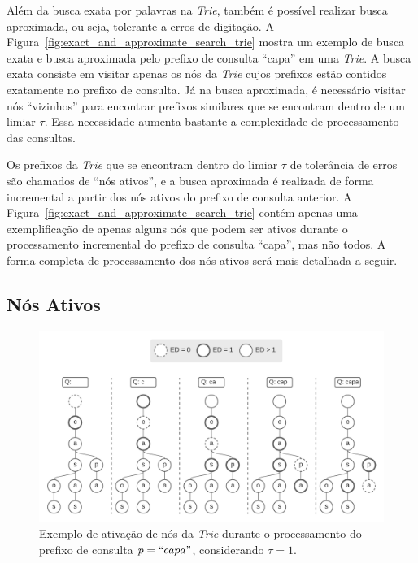 Além da busca exata por palavras na \textit{Trie}, também é possível realizar busca aproximada, ou seja, tolerante a erros de digitação. A Figura~\ref{fig:exact_and_approximate_search_trie} mostra um exemplo de busca exata e busca aproximada pelo prefixo de consulta ``capa'' em uma \textit{Trie}. A busca exata consiste em visitar apenas os nós da \textit{Trie} cujos prefixos estão contidos exatamente no prefixo de consulta. Já na busca aproximada, é necessário visitar nós ``vizinhos'' para encontrar prefixos similares que se encontram dentro de um limiar $\tau$. Essa necessidade aumenta bastante a complexidade de processamento das consultas. 

Os prefixos da \textit{Trie} que se encontram dentro do limiar $\tau$ de tolerância de erros são chamados de ``nós ativos'', e a busca aproximada é realizada de forma incremental a partir dos nós ativos do prefixo de consulta anterior. A Figura~\ref{fig:exact_and_approximate_search_trie} contém apenas uma exemplificação de apenas alguns nós que podem ser ativos durante o processamento incremental do prefixo de consulta ``capa'', mas não todos. A forma completa de processamento dos nós ativos será mais detalhada a seguir.

\subsection{Nós Ativos}
\label{sec:active_nodes}

\begin{figure}[ht]
    \centering
    \includegraphics[width=1\textwidth]{figures/trie_active_nodes_example.png}
    \caption{Exemplo de ativação de nós da \textit{Trie} durante o processamento do prefixo de consulta $p = ``capa"$, considerando $\tau = 1$. }
    \label{fig:active_nodes_example}
\end{figure}

